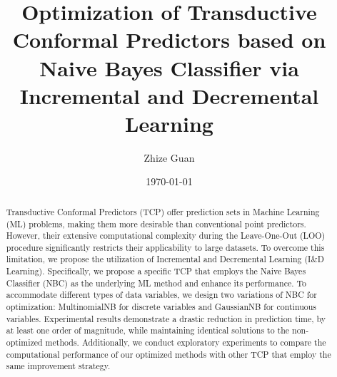 \documentclass[10pt]{reportMaster}
\title{Optimization of Transductive Conformal Predictors based on Naive Bayes Classifier via Incremental and Decremental Learning}
\author{Zhize Guan}
\date{\today}
\begin{document}
\maketitle

\begin{abstract}
Transductive Conformal Predictors (TCP) offer prediction sets in Machine Learning (ML) problems, making them more desirable than conventional point predictors. However, their extensive computational complexity during the Leave-One-Out (LOO) procedure significantly restricts their applicability to large datasets. To overcome this limitation, we propose the utilization of Incremental and Decremental Learning (I\&D Learning). Specifically, we propose a specific TCP that employs the Naive Bayes Classifier (NBC) as the underlying ML method and enhance its performance. To accommodate different types of data variables, we design two variations of NBC for optimization: MultinomialNB for discrete variables and GaussianNB for continuous variables. Experimental results demonstrate a drastic reduction in prediction time, by at least one order of magnitude, while maintaining identical solutions to the non-optimized methods. Additionally, we conduct exploratory experiments to compare the computational performance of our optimized methods with other TCP that employ the same improvement strategy.

\end{abstract}

\newpage
\tableofcontents

\cleardoublepage
{}
\listoffigures
\cleardoublepage
{}
\listoftables
\cleardoublepage
{}
\listofabbrs
\end{document}
